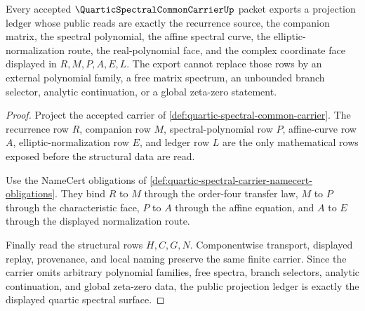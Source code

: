 \begin{theorem}
\label{thm:quartic-spectral-projection-ledger}
Every accepted $\QuarticSpectralCommonCarrierUp$ packet exports a projection ledger whose public reads are exactly the recurrence source, the companion matrix, the spectral polynomial, the affine spectral curve, the elliptic-normalization route, the real-polynomial face, and the complex coordinate face displayed in $R,M,P,A,E,L$. The export cannot replace those rows by an external polynomial family, a free matrix spectrum, an unbounded branch selector, analytic continuation, or a global zeta-zero statement.
\end{theorem}
\begin{proof}
Project the accepted carrier of \autoref{def:quartic-spectral-common-carrier}. The recurrence row $R$, companion row $M$, spectral-polynomial row $P$, affine-curve row $A$, elliptic-normalization row $E$, and ledger row $L$ are the only mathematical rows exposed before the structural data are read.

Use the NameCert obligations of \autoref{def:quartic-spectral-carrier-namecert-obligations}. They bind $R$ to $M$ through the order-four transfer law, $M$ to $P$ through the characteristic face, $P$ to $A$ through the affine equation, and $A$ to $E$ through the displayed normalization route.

Finally read the structural rows $H,C,G,N$. Componentwise transport, displayed replay, provenance, and local naming preserve the same finite carrier. Since the carrier omits arbitrary polynomial families, free spectra, branch selectors, analytic continuation, and global zeta-zero data, the public projection ledger is exactly the displayed quartic spectral surface.
\end{proof}

\begin{closurestatus}{\QuarticSpectralCommonCarrierUp}
  \theoryclosure{\seedClosure}
  \formalstatus{\unformalizedV}
\end{closurestatus}
